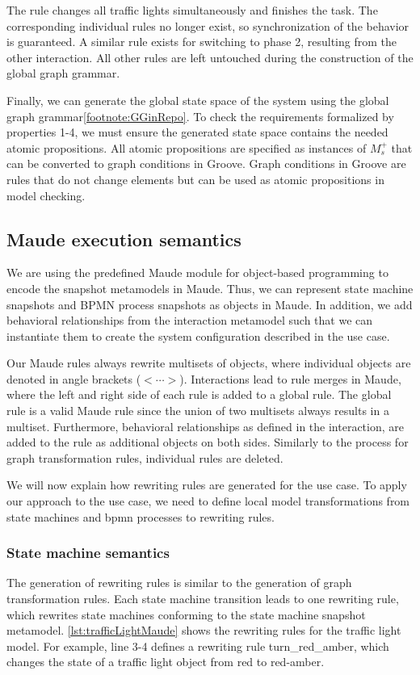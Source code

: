 \documentclass{jot}
\begin{document}
The rule changes all traffic lights simultaneously and finishes the task.
The corresponding individual rules no longer exist, so synchronization of the behavior is guaranteed.
A similar rule exists for switching to phase 2, resulting from the other interaction.
All other rules are left untouched during the construction of the global graph grammar.

Finally, we can generate the global state space of the system using the global graph grammar\cref{footnote:GGinRepo}.
To check the requirements formalized by properties 1-4, we must ensure the generated state space contains the needed atomic propositions.
All atomic propositions are specified as instances of $M_s^+$ that can be converted to graph conditions in Groove.
Graph conditions in Groove are rules that do not change elements but can be used as atomic propositions in model checking.

\subsection{Maude execution semantics}
We are using the predefined Maude module for object-based programming to encode the snapshot metamodels in Maude.
Thus, we can represent state machine snapshots and BPMN process snapshots as objects in Maude.
In addition, we add behavioral relationships from the interaction metamodel such that we can instantiate them to create the system configuration described in the use case.

Our Maude rules always rewrite multisets of objects, where individual objects are denoted in angle brackets ($<\cdots>$).
Interactions lead to rule merges in Maude, where the left and right side of each rule is added to a global rule.
The global rule is a valid Maude rule since the union of two multisets always results in a multiset. 
Furthermore, behavioral relationships as defined in the interaction, are added to the rule as additional objects on both sides.
Similarly to the process for graph transformation rules, individual rules are deleted.

We will now explain how rewriting rules are generated for the use case.
To apply our approach to the use case, we need to define local model transformations from state machines and \gls*{bpmn} processes to rewriting rules.

\subsubsection{State machine semantics}
The generation of rewriting rules is similar to the generation of graph transformation rules.
Each state machine transition leads to one rewriting rule, which rewrites state machines conforming to the state machine snapshot metamodel.
\autoref{lst:trafficLightMaude} shows the rewriting rules for the traffic light model.
For example, line 3-4 defines a rewriting rule \textsf{turn\_red\_amber}, which changes the state of a traffic light object from red to red-amber.
\end{document}
